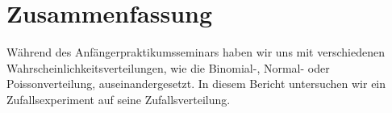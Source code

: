 \documentclass[ngerman]{scrartcl}
\begin{document}

\section*{\centering Zusammenfassung}
Während des Anfängerpraktikumsseminars haben wir uns mit verschiedenen Wahrscheinlichkeitsverteilungen, wie die Binomial-, Normal- oder Poissonverteilung, auseinandergesetzt. In diesem Bericht untersuchen wir ein Zufallsexperiment auf seine Zufallsverteilung.

\tableofcontents

\pagestyle{scrheadings} %



\end{document}
